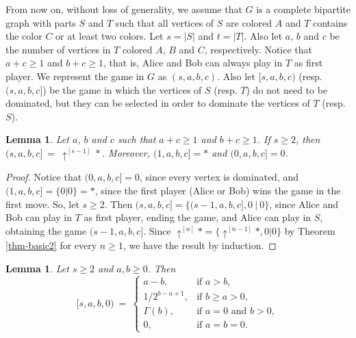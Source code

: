 \documentclass[a4paper,11pt]{article}
\newtheorem{lemma}[theorem]{Lemma}
\begin{document}
From now on, without loss of generality, we assume that $G$ is a complete bipartite graph with parts $S$ and $T$ such that all vertices of $S$ are colored $A$ and $T$ contains the color $C$ or at least two colors. Let $s=|S|$ and $t=|T|$. Also let $a$, $b$ and $c$ be the number of vertices in $T$ colored $A$, $B$ and $C$, respectively. Notice that $a+c\geq 1$ and $b+c\geq 1$, that is, Alice and Bob can always play in $T$ as first player.
We represent the game in $G$ as $(s,a,b,c)$.
Also let $[s,a,b,c)$ (resp. $(s,a,b,c]$) be the game in which the vertices of $S$ (resp. $T$) do not need to be dominated, but they can be selected in order to dominate the vertices of $T$ (resp. $S$).

\begin{lemma}\label{lem-esq}
Let $a$, $b$ and $c$ such that $a+c\geq 1$ and $b+c\geq 1$.
If $s\geq 2$, then $(s,a,b,c]\ =\ \uparrow^{[s-1]}*$. Moreover, $(1,a,b,c]=*$ and $(0,a,b,c]=0$.
\end{lemma}

\begin{proof}
Notice that $(0,a,b,c]=0$, since every vertex is dominated, and $(1,a,b,c]=\{0|0\}=*$, since the first player (Alice or Bob) wins the game in the first move.
So, let $s\geq 2$.
Then $(s,a,b,c] = \{(s-1,a,b,c],0\ |\ 0\}$, since Alice and Bob can play in $T$ as first player, ending the game, and Alice can play in $S$, obtaining the game $(s-1,a,b,c]$.
Since $\uparrow^{[n]}*=\{\uparrow^{[n-1]}*,0|0\}$ by Theorem \ref{thm-basic2} for every $n\geq 1$, we have the result by induction.
\end{proof}

\begin{lemma}\label{lem-czero}
Let $s\geq 2$ and $a,b\geq 0$. Then
\[
  [s,a,b,0)\ =\ 
 \begin{cases}
    a-b, &\mbox{if $a>b$},\\
    1/2^{b-a+1}, &\mbox{if $b\geq a>0$},\\
    \Gamma(b), &\mbox{if $a=0$ and $b>0$},\\
    0, &\mbox{if $a=b=0$}.
 \end{cases}
\]
\end{lemma}
\end{document}
